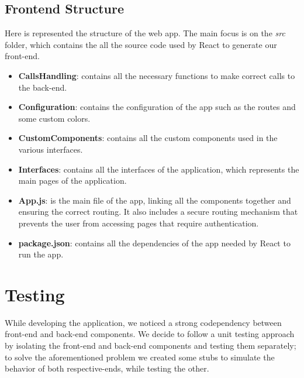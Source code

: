 \documentclass[table, 12pt]{article}
\begin{document}
\subsection{Frontend Structure}
Here is represented the structure of the web app. The main focus is on the \textit{src} folder, which contains the all the source code used by React to generate our front-end.
\begin{itemize}
    \item \textbf{CallsHandling}: contains all the necessary functions to make correct calls to the back-end.
    \item \textbf{Configuration}: contains the configuration of the app such as the routes and some custom colors.
    \item \textbf{CustomComponents}: contains all the custom components used in the various interfaces.
    \item \textbf{Interfaces}: contains all the interfaces of the application, which represents the main pages of the application.
    \item \textbf{App.js}: is the main file of the app, linking all the components together and ensuring the correct routing. It also includes a secure routing mechanism that prevents the user from accessing pages that require authentication.
    \item \textbf{package.json}: contains all the dependencies of the app needed by React to run the app. 
\end{itemize}

\newpage
\section{Testing}
While developing the application, we noticed a strong codependency between front-end and back-end components.
We decide to follow a unit testing approach by isolating the front-end and back-end components and testing them separately; to solve the aforementioned problem we created some stubs to simulate the behavior of both respective-ends, while testing the other.
\end{document}
